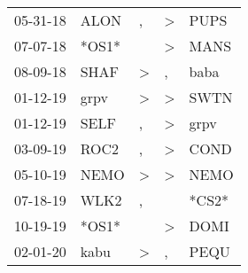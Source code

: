 \begin{supertabular}{lllll}
 05-31-18 &   ALON &                , &     \textgreater &   PUPS \\
 07-07-18 &  *OS1* &                  &     \textgreater &   MANS \\
 08-09-18 &   SHAF &     \textgreater &                , &   baba \\
 01-12-19 &   grpv &     \textgreater &     \textgreater &   SWTN \\
 01-12-19 &   SELF &                , &     \textgreater &   grpv \\
 03-09-19 &   ROC2 &                , &     \textgreater &   COND \\
 05-10-19 &   NEMO &     \textgreater &     \textgreater &   NEMO \\
 07-18-19 &   WLK2 &                , &                  &  *CS2* \\
 10-19-19 &  *OS1* &                  &     \textgreater &   DOMI \\
 02-01-20 &   kabu &     \textgreater &                , &   PEQU \\
\end{supertabular}
